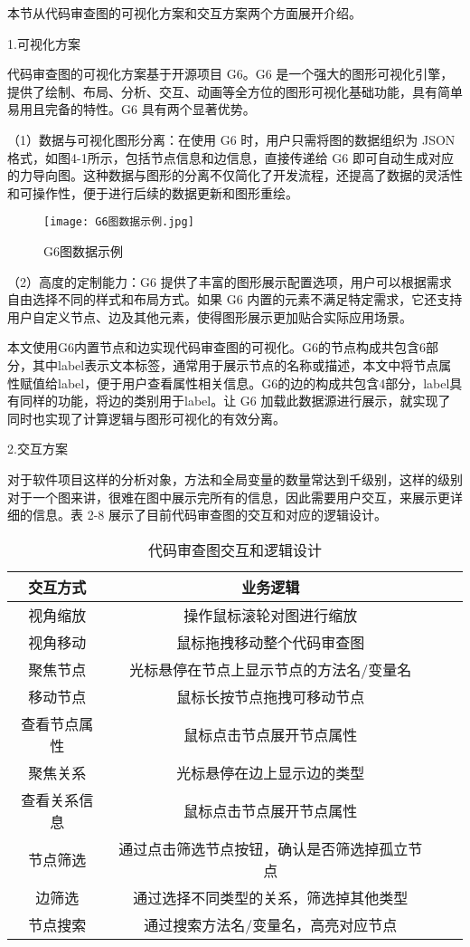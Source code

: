 本节从代码审查图的可视化方案和交互方案两个方面展开介绍。

1.可视化方案 

代码审查图的可视化方案基于开源项目 G6。G6 是一个强大的图形可视化引擎，提供了绘制、布局、分析、交互、动画等全方位的图形可视化基础功能，具有简单易用且完备的特性。G6 具有两个显著优势。

（1）数据与可视化图形分离：在使用 G6 时，用户只需将图的数据组织为 JSON 格式，如图4-1所示，包括节点信息和边信息，直接传递给 G6 即可自动生成对应的力导向图。这种数据与图形的分离不仅简化了开发流程，还提高了数据的灵活性和可操作性，便于进行后续的数据更新和图形重绘。

\begin{figure}[h]
\centering
\texttt{[image: G6图数据示例.jpg]}
\caption{G6图数据示例}
\end{figure}

（2）高度的定制能力：G6 提供了丰富的图形展示配置选项，用户可以根据需求自由选择不同的样式和布局方式。如果 G6 内置的元素不满足特定需求，它还支持用户自定义节点、边及其他元素，使得图形展示更加贴合实际应用场景。

本文使用G6内置节点和边实现代码审查图的可视化。G6的节点构成共包含6部分，其中label表示文本标签，通常用于展示节点的名称或描述，本文中将节点属性赋值给label，便于用户查看属性相关信息。G6的边的构成共包含4部分，label具有同样的功能，将边的类别用于label。让 G6 加载此数据源进行展示，就实现了同时也实现了计算逻辑与图形可视化的有效分离。


2.交互方案

对于软件项目这样的分析对象，方法和全局变量的数量常达到千级别，这样的级别对于一个图来讲，很难在图中展示完所有的信息，因此需要用户交互，来展示更详细的信息。表 2-8 展示了目前代码审查图的交互和对应的逻辑设计。




\begin{table}[htbp]
\caption{代码审查图交互和逻辑设计}
\vspace{0.5em}\centering\wuhao
\begin{tabular}{cccc}
\toprule
交互方式 & 业务逻辑 \\
\midrule
视角缩放 & 操作鼠标滚轮对图进行缩放  \\
视角移动 & 鼠标拖拽移动整个代码审查图   \\
聚焦节点 & 光标悬停在节点上显示节点的方法名/变量名  \\
移动节点 & 鼠标长按节点拖拽可移动节点 \\
查看节点属性 & 鼠标点击节点展开节点属性  \\
聚焦关系 & 光标悬停在边上显示边的类型  \\
查看关系信息 & 鼠标点击节点展开节点属性  \\
节点筛选 & 通过点击筛选节点按钮，确认是否筛选掉孤立节点 \\
边筛选 & 通过选择不同类型的关系，筛选掉其他类型 \\
节点搜索 & 通过搜索方法名/变量名，高亮对应节点  \\
\bottomrule
\end{tabular}
\end{table}



